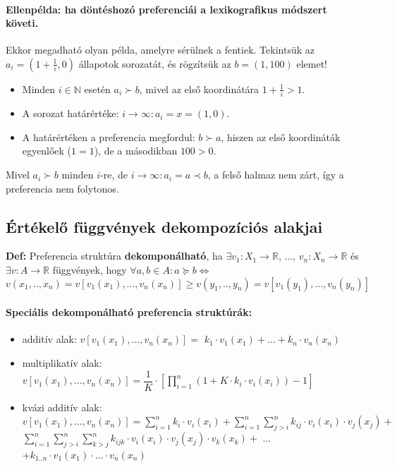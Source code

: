 \documentclass[a4paper,12pt]{article}
\begin{document}
\paragraph{Ellenpélda: ha döntéshozó preferenciái a lexikografikus módszert követi.}

Ekkor megadható olyan példa, amelyre sérülnek a fentiek.
Tekintsük az $a_i = \left(1 + \frac{1}{i}, 0\right)$ állapotok sorozatát, és rögzítsük az $b = (1, 100)$ elemet!
\begin{itemize}
    \item Minden $i \in \mathbb{N}$ esetén $a_i \succ b$, mivel az első koordinátára $1 + \frac{1}{i} > 1$.
    \item A sorozat határértéke: ${i \to \infty} : a_i = x = (1, 0)$.
    \item A határértéken a preferencia megfordul: $b \succ a$, hiszen az első koordináták egyenlőek ($1 = 1$), de a másodikban $100 > 0$.
\end{itemize}
Mivel $a_i \succ b$ minden $i$-re, de $i \to \infty : a_i = a \prec b$, a felső halmaz nem zárt, így a preferencia nem folytonos.

\subsection{Értékelő függvények dekompozíciós alakjai}

\textbf{Def: } Preferencia struktúra \textbf{dekomponálható}, ha
$\exists v_1: X_1 \rightarrow \mathbb{R}$, ..., $v_n: X_n \rightarrow \mathbb{R}$ és $\exists v: A \rightarrow \mathbb{R}$ függvények, hogy
$\forall a, b \in A: a \succeq  b \Leftrightarrow $
\begin{equation}
v(x_1, .., x_n)=v[v_1(x_1), ..., v_n(x_n)] \geq v(y_1, .., y_n)=v[v_1(y_1), ..., v_n(y_n)]
\end{equation}

\paragraph{Speciális dekomponálható preferencia struktúrák:}
\begin{itemize}
\item additív alak: $v[v_1(x_1), ..., v_n(x_n)] = $ $k_1 \cdot v_1(x_1) + ... + k_n \cdot v_n(x_n)$
\item multiplikatív alak: $v[v_1(x_1), ..., v_n(x_n)] = \dfrac{1}{K} \cdot [ \prod_{i=1}^n ( 1 + K \cdot k_i \cdot v_i(x_i)) - 1 ]$
\item kvázi additív alak: $v[v_1(x_1), ..., v_n(x_n)] = \sum_{i=1}^n k_i \cdot v_i(x_i)+
\sum_{i=1}^n \sum_{j>i}^n k_{ij} \cdot v_i(x_i) \cdot v_j(x_j) +$
$\sum_{i=1}^n \sum_{j>i}^n \sum_{k>j}^n k_{ijk} \cdot v_i(x_i) \cdot v_j(x_j) \cdot v_k(x_k) +$ ... 
$+k_{1..n} \cdot v_1(x_1) \cdot ... \cdot v_n(x_n) $
\end{itemize}
\end{document}
